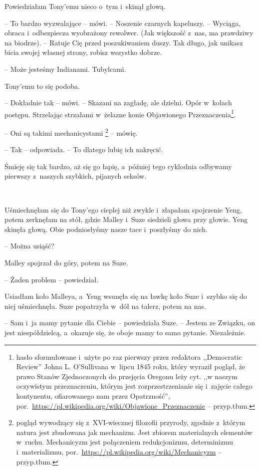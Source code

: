 \documentclass[oneside,polish,11pt,sfheadings]{mwbk}
\begin{document}
Powiedziałam Tony'emu nieco o~tym i~skinął głową.

-- To bardzo wyzwalające -- mówi. -- Noszenie czarnych kapeluszy. -- Wyciąga, obraca i~odbezpiecza wyobrażony rewolwer. (Jak większość z~nas,
ma prawdziwy na biodrze). -- Ratuje Cię przed poszukiwaniem duszy. Tak
długo, jak unikasz bicia swojej własnej strony, robisz wszystko dobrze.

-- Może jesteśmy Indianami. Tubylcami.

Tony'emu to się podoba. 

-- Dokładnie tak -- mówi. -- Skazani na zagładę,
ale dzielni. Opór w~kołach postępu. Strzelając strzałami w~żelazne konie
Objawionego Przeznaczenia\footnote{ hasło sformułowane i~użyte po raz pierwszy
przez redaktora ,,Democratic Review'' Johna L. O'Sullivana w~lipcu 1845
roku, który wyraził pogląd, że prawo Stanów Zjednoczonych do przejęcia
Oregonu leży cyt. ,,w naszym oczywistym przeznaczeniu, którym jest
rozprzestrzenianie się i~zajęcie całego kontynentu, ofiarowanego nam
przez Opatrzność'',
por.~\url{https://pl.wikipedia.org/wiki/Objawione\_Przeznaczenie}
-- przyp.tłum.}.

-- Oni są takimi mechanicystami \footnote{ pogląd wywodzący się z~XVI-wiecznej
filozofii przyrody, zgodnie z~którym natura jest zbudowana jak
mechanizm. Jest zbiorem materialnych elementów w~ruchu. Mechanicyzm jest połączeniem
redukcjonizmu, determinizmu i~materializmu,
por.~\url{https://pl.wikipedia.org/wiki/Mechanicyzm} -- przyp.tłum.} -- mówię.

-- Tak -- odpowiada. -- To dlatego lubię ich nakręcić.

Śmieję się tak bardzo, aż się go łapię, a~później tego cyklodnia
odbywamy pierwszy z~naszych szybkich, pijanych seksów.

~

Uśmiechnęłam się do Tony'ego cieplej niż zwykle i~złapałam spojrzenie
Yeng, potem zerknęłam na stół, gdzie Malley i~Suze siedzieli głowa przy
głowie. Yeng skinęła głową. Obie podniosłyśmy nasze tace i~poszłyśmy do
nich.

-- Można usiąść?

Malley spojrzał do góry, potem na Suze. 

-- Żaden problem -- powiedział.

Usiadłam koło Malleya, a~Yeng wsunęła się na ławkę koło Suze i~szybko
się do niej uśmiechnęła. Suze popatrzyła w~dół na talerz, potem na nas.

-- Sam i~ja mamy pytanie dla Ciebie -- powiedziała Suze. -- Jestem ze
Związku, on jest niespółdzielcą, a~okazuje się, że oboje mamy to samo
pytanie. Niezależnie.
\end{document}

